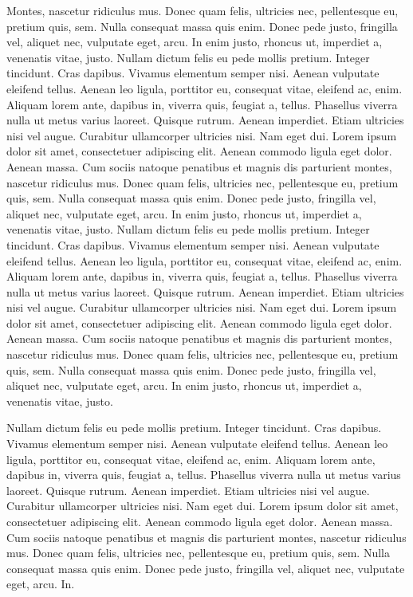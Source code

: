 \documentclass[
    12pt,
    letterpaper,
    oneside,
    noraggedright
]{turabian-researchpaper}
\begin{document}
Montes, nascetur ridiculus mus. Donec quam felis, ultricies nec,
pellentesque eu, pretium quis, sem. Nulla consequat massa quis enim.
Donec pede justo, fringilla vel, aliquet nec, vulputate eget, arcu. In
enim justo, rhoncus ut, imperdiet a, venenatis vitae, justo. Nullam
dictum felis eu pede mollis pretium. Integer tincidunt. Cras dapibus.
Vivamus elementum semper nisi. Aenean vulputate eleifend tellus. Aenean
leo ligula, porttitor eu, consequat vitae, eleifend ac, enim. Aliquam
lorem ante, dapibus in, viverra quis, feugiat a, tellus. Phasellus
viverra nulla ut metus varius laoreet. Quisque rutrum. Aenean imperdiet.
Etiam ultricies nisi vel augue. Curabitur ullamcorper ultricies nisi.
Nam eget dui. Lorem ipsum dolor sit amet, consectetuer adipiscing elit.
Aenean commodo ligula eget dolor. Aenean massa. Cum sociis natoque
penatibus et magnis dis parturient montes, nascetur ridiculus mus. Donec
quam felis, ultricies nec, pellentesque eu, pretium quis, sem. Nulla
consequat massa quis enim. Donec pede justo, fringilla vel, aliquet nec,
vulputate eget, arcu. In enim justo, rhoncus ut, imperdiet a, venenatis
vitae, justo. Nullam dictum felis eu pede mollis pretium. Integer
tincidunt. Cras dapibus. Vivamus elementum semper nisi. Aenean vulputate
eleifend tellus. Aenean leo ligula, porttitor eu, consequat vitae,
eleifend ac, enim. Aliquam lorem ante, dapibus in, viverra quis, feugiat
a, tellus. Phasellus viverra nulla ut metus varius laoreet. Quisque
rutrum. Aenean imperdiet. Etiam ultricies nisi vel augue. Curabitur
ullamcorper ultricies nisi. Nam eget dui. Lorem ipsum dolor sit amet,
consectetuer adipiscing elit. Aenean commodo ligula eget dolor. Aenean
massa. Cum sociis natoque penatibus et magnis dis parturient montes,
nascetur ridiculus mus. Donec quam felis, ultricies nec, pellentesque
eu, pretium quis, sem. Nulla consequat massa quis enim. Donec pede
justo, fringilla vel, aliquet nec, vulputate eget, arcu. In enim justo,
rhoncus ut, imperdiet a, venenatis vitae, justo.

Nullam dictum felis eu pede mollis pretium. Integer tincidunt. Cras
dapibus. Vivamus elementum semper nisi. Aenean vulputate eleifend
tellus. Aenean leo ligula, porttitor eu, consequat vitae, eleifend ac,
enim. Aliquam lorem ante, dapibus in, viverra quis, feugiat a, tellus.
Phasellus viverra nulla ut metus varius laoreet. Quisque rutrum. Aenean
imperdiet. Etiam ultricies nisi vel augue. Curabitur ullamcorper
ultricies nisi. Nam eget dui. Lorem ipsum dolor sit amet, consectetuer
adipiscing elit. Aenean commodo ligula eget dolor. Aenean massa. Cum
sociis natoque penatibus et magnis dis parturient montes, nascetur
ridiculus mus. Donec quam felis, ultricies nec, pellentesque eu, pretium
quis, sem. Nulla consequat massa quis enim. Donec pede justo, fringilla
vel, aliquet nec, vulputate eget, arcu. In.
\end{document}
